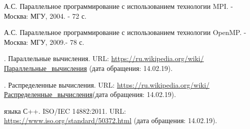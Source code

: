 {\begin{enumerate}
         А.С. Параллельное программирование с использованием технологии MPI. - Москва: МГУ, 2004. - 72 с.
        
		 А.С. Параллельное программирование с использованием технологии OpenMP. - Москва: МГУ, 2009.- 78 с.
  
		. Параллельные вычисления. URL: \href{https://ru.wikipedia.org/wiki/%D0%9F%D0%B0%D1%80%D0%B0%D0%BB%D0%BB%D0%B5%D0%BB%D1%8C%D0%BD%D1%8B%D0%B5_%D0%B2%D1%8B%D1%87%D0%B8%D1%81%D0%BB%D0%B5%D0%BD%D0%B8%D1%8F} {https://ru.wikipedia.org/wiki/Параллельные\_вычисления} (дата обращения: 14.02.19).
  
		. Распределенные вычисления. URL: \href{https://ru.wikipedia.org/wiki/%D0%A0%D0%B0%D1%81%D0%BF%D1%80%D0%B5%D0%B4%D0%B5%D0%BB%D1%91%D0%BD%D0%BD%D1%8B%D0%B5_%D0%B2%D1%8B%D1%87%D0%B8%D1%81%D0%BB%D0%B5%D0%BD%D0%B8%D1%8F} {https://ru.wikipedia.org/wiki/Распределенные\_вычисления}(дата обращения: 14.02.19).
  
		 языка С++. ISO/IEC 14882:2011. URL: \href{https://www.iso.org/standard/50372.html}{https://www.iso.org/standard/50372.html} (дата обращения: 14.02.19).
  

\end{enumerate}}
